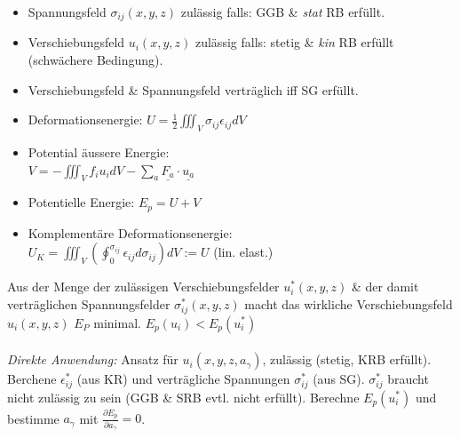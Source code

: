 \documentclass[a4paper,10pt]{article}
\begin{document}
\begin{multicols*}{3}

            \vspace{-4mm}
            \begin{itemize}
                \item Spannungsfeld $\sigma_{ij}(x,y,z)$ zulässig falls: GGB \& \textit{stat} RB erfüllt.
                \item Verschiebungsfeld $u_i(x,y,z)$ zulässig falls: stetig \& \textit{kin} RB erfüllt (schwächere Bedingung).
                \item Verschiebungsfeld \& Spannungsfeld verträglich iff SG erfüllt.
                \item Deformationsenergie: $\displaystyle U=\frac{1}{2}\iiint_V \sigma_{ij}\epsilon_{ij}dV$
                \item Potential äussere Energie:\\
                $\displaystyle V=-\iiint_V f_iu_idV-\sum_{a}\underline{F_a}\cdot\underline{u_a}$ 
                \item Potentielle Energie: $E_p=U+V$
                \item Komplementäre Deformationsenergie:\\ $U_K=\iiint_V(\oint_0^{\sigma_{ij}}\epsilon_{ij}d\sigma_{ij})dV := U$  (lin. elast.)
            \end{itemize}
            
            Aus der Menge der zulässigen Verschiebungsfelder $u_i^*(x,y,z)$ \& der damit verträglichen Spannungsfelder $\sigma_{ij}^*(x,y,z)$ macht das wirkliche Verschiebungsfeld $u_i(x,y,z)$ $E_P$ minimal. $E_p(u_i) < E_p(u_i^*)$\\\\
            \textit{Direkte Anwendung:} Ansatz für $u_i(x,y,z,a_\gamma)$, zulässig (stetig, KRB erfüllt). Berchene $\epsilon_{ij}^*$ (aus KR) und verträgliche Spannungen $\sigma_{ij}^*$ (aus SG). $\sigma_{ij}^*$ braucht nicht zulässig zu sein (GGB \& SRB evtl. nicht erfüllt). Berechne $E_p(u_i^*)$ und bestimme $a_\gamma$ mit $\frac{\partial E_p}{\partial a_\gamma}=0$.
            

\end{multicols*}
\end{document}
